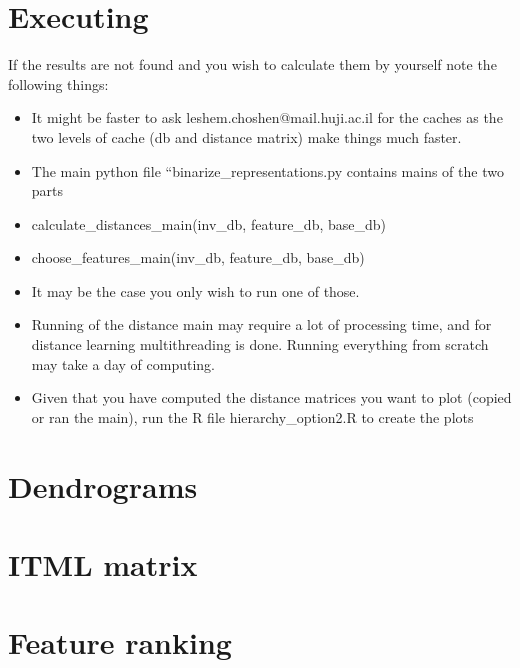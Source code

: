 \documentclass[letterpaper, 11pt]{article}
\begin{document}
\section{Executing}
If the results are not found and you wish to calculate them by yourself note the following things:
\begin{itemize}
	\item It might be faster to ask leshem.choshen@mail.huji.ac.il for the caches as the two levels of cache (db and distance matrix) make things much faster.
	\item  The main python file “binarize\_representations.py contains mains of the two parts
	\item calculate\_distances\_main(inv\_db, feature\_db, base\_db)
	\item choose\_features\_main(inv\_db, feature\_db, base\_db)
	\item  It may be the case you only wish to run one of those.
	\item Running of the distance main may require a lot of processing time, and for distance learning multithreading is done. Running everything from scratch may take a day of computing.
	\item Given that you have computed the distance matrices you want to plot (copied or ran the main), run the R file hierarchy\_option2.R to create the plots
\end{itemize}

\section{Dendrograms}\label{ap:dendrograms}

\section{ITML matrix}\label{ap:itml}
\section{Feature ranking}\label{ap:features}




\end{document}
